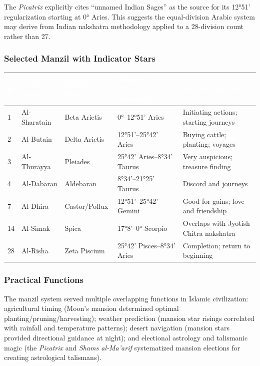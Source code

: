 \documentclass[11pt,letterpaper]{article}
\newcommand{\tableheader}[1]{\textbf{\sffamily\textcolor{white}{#1}}}
\begin{document}
The \textit{Picatrix} explicitly cites ``unnamed Indian Sages'' as the source for its 12°51' regularization starting at 0° Aries. This suggests the equal-division Arabic system may derive from Indian nakshatra methodology applied to a 28-division count rather than 27.

\subsubsection{Selected Manzil with Indicator Stars}

\begin{center}
\begin{tabularx}{\textwidth}{C{0.7cm}L{2.5cm}L{2.5cm}L{3cm}X}
\toprule
{}
\tableheader{\#} & \tableheader{Arabic Name} & \tableheader{Indicator Star} & \tableheader{Tropical Position (Picatrix)} & \tableheader{Primary Indication} \\
 & Al-Sharatain & Beta Arietis & 0°--12°51' Aries & Initiating actions; starting journeys \\
2 & Al-Butain & Delta Arietis & 12°51'--25°42' Aries & Buying cattle; planting; voyages \\
3 & Al-Thurayya & Pleiades & 25°42' Aries--8°34' Taurus & Very auspicious; treasure finding \\
4 & Al-Dabaran & Aldebaran & 8°34'--21°25' Taurus & Discord and journeys \\
7 & Al-Dhira & Castor/Pollux & 12°51'--25°42' Gemini & Good for gains; love and friendship \\
14 & Al-Simak & Spica & 17°8'--0° Scorpio & Overlaps with Jyotish Chitra nakshatra \\
28 & Al-Risha & Zeta Piscium & 25°42' Pisces--8°34' Aries & Completion; return to beginning \\
\bottomrule
\end{tabularx}
\end{center}

\subsubsection{Practical Functions}

The manzil system served multiple overlapping functions in Islamic civilization: agricultural timing (Moon's mansion determined optimal planting/pruning/harvesting); weather prediction (mansion star risings correlated with rainfall and temperature patterns); desert navigation (mansion stars provided directional guidance at night); and electional astrology and talismanic magic (the \textit{Picatrix} and \textit{Shams al-Ma'arif} systematized mansion elections for creating astrological talismans).
\end{document}
